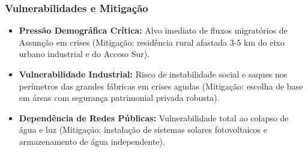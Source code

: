 \subsubsection{Vulnerabilidades e
Mitigação}

\begin{itemize}
\tightlist
\item
  \textbf{Pressão Demográfica Crítica:} Alvo imediato de fluxos
  migratórios de Assunção em crises (Mitigação: residência rural
  afastada 3-5 km do eixo urbano industrial e do Acceso Sur).
\item
  \textbf{Vulnerabilidade Industrial:} Risco de instabilidade social e
  saques nos perímetros das grandes fábricas em crises agudas
  (Mitigação: escolha de base em áreas com segurança patrimonial privada
  robusta).
\item
  \textbf{Dependência de Redes Públicas:} Vulnerabilidade total ao
  colapso de água e luz (Mitigação: instalação de sistemas solares
  fotovoltaicos e armazenamento de água independente).
\end{itemize}

